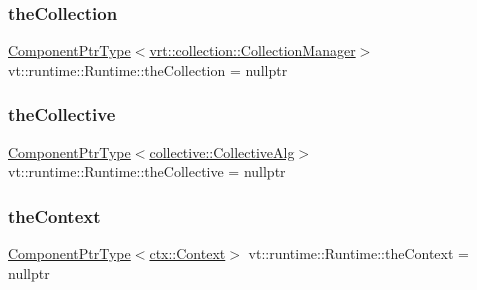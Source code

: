 \mbox{\label{structvt_1_1runtime_1_1_runtime_a9c74bf08aceff27fa43330d3f1c8d581}} 
\subsubsection{\texorpdfstring{the\+Collection}{theCollection}}
{\footnotesize\ttfamily \hyperlink{structvt_1_1runtime_1_1_runtime_a0893bf0a8c03b898e8ab66b52cec80ad}{Component\+Ptr\+Type}$<$\hyperlink{structvt_1_1vrt_1_1collection_1_1_collection_manager}{vrt\+::collection\+::\+Collection\+Manager}$>$ vt\+::runtime\+::\+Runtime\+::the\+Collection = nullptr}

\mbox{\label{structvt_1_1runtime_1_1_runtime_a52b4a07eacf90a576f077e193604eab9}} 
\subsubsection{\texorpdfstring{the\+Collective}{theCollective}}
{\footnotesize\ttfamily \hyperlink{structvt_1_1runtime_1_1_runtime_a0893bf0a8c03b898e8ab66b52cec80ad}{Component\+Ptr\+Type}$<$\hyperlink{structvt_1_1collective_1_1_collective_alg}{collective\+::\+Collective\+Alg}$>$ vt\+::runtime\+::\+Runtime\+::the\+Collective = nullptr}

\mbox{\label{structvt_1_1runtime_1_1_runtime_a572dac3bef0126b593a93b2c651efb7e}} 
\subsubsection{\texorpdfstring{the\+Context}{theContext}}
{\footnotesize\ttfamily \hyperlink{structvt_1_1runtime_1_1_runtime_a0893bf0a8c03b898e8ab66b52cec80ad}{Component\+Ptr\+Type}$<$\hyperlink{structvt_1_1ctx_1_1_context}{ctx\+::\+Context}$>$ vt\+::runtime\+::\+Runtime\+::the\+Context = nullptr}

